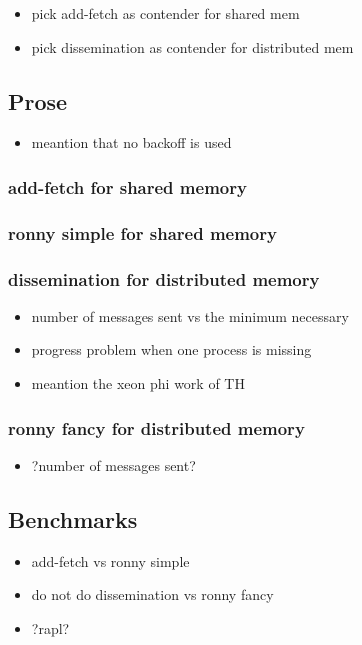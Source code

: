 \documentclass[a4paper, 10pt]{article}
\begin{document}
\begin{itemize}
	\item pick add-fetch as contender for shared mem
	\item pick dissemination as contender for distributed mem
\end{itemize}

\subsection{Prose}
\begin{itemize}
	\item meantion that no backoff is used
\end{itemize}

\subsubsection{add-fetch for shared memory}
\subsubsection{ronny simple for shared memory}
\subsubsection{dissemination for distributed memory}
\begin{itemize}
	\item number of messages sent vs the minimum necessary
	\item progress problem when one process is missing
	\item meantion the xeon phi work of TH
\end{itemize}
\subsubsection{ronny fancy for distributed memory}
\begin{itemize}
	\item ?number of messages sent?
\end{itemize}

\subsection{Benchmarks}
\begin{itemize}
	\item add-fetch vs ronny simple
	\item do not do dissemination vs ronny fancy
	\item ?rapl?
\end{itemize}
\end{document}
